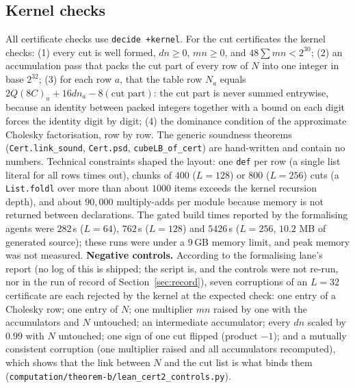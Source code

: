 \documentclass[11pt]{amsart}
\theoremstyle{remark}
\newcommand{\lean}[1]{\texttt{#1}}
\begin{document}
\subsection{Kernel checks}
All certificate checks use \texttt{decide +kernel}. For the cut certificates the kernel checks: (1) every cut is well formed, $dn\ge0$, $mn\ge0$, and $48\sum mn<2^{30}$; (2) an accumulation pass that packs the cut part of every row of $N$ into one integer in base $2^{32}$;
(3) for each row $a$, that the table row $N_a$ equals $2Q(8C)_a+16dn_a-8(\text{cut part})$: the cut part is never summed entrywise, because an identity between packed integers together with a bound on each digit
forces the identity digit by digit; (4) the dominance condition of the approximate Cholesky factorisation, row by row. The generic soundness theorems (\lean{Cert.link\_sound}, \lean{Cert.psd}, \lean{cubeLB\_of\_cert}) are hand-written and contain no numbers.
Technical constraints shaped the layout: one \texttt{def} per row (a single list literal for all rows times out), chunks of $400$ ($L=128$) or $800$ ($L=256$) cuts (a \texttt{List.foldl} over more than about $1000$ items exceeds the kernel recursion depth), and about $90{,}000$ multiply-adds per module
because memory is not returned between declarations. The gated build times reported by the formalising agents were $282$\,s ($L=64$), $762$\,s ($L=128$) and $5426$\,s ($L=256$, $10.2$ MB of generated source); these runs were under a $9$\,GB memory limit, and peak memory was not measured.
\textbf{Negative controls.} According to the formalising lane's report (no log of this is shipped; the script is, and the controls were not re-run, nor in the run of record of Section~\ref{sec:record}), seven corruptions of an $L=32$ certificate are each rejected by the kernel at the expected check: one entry of a Cholesky row; one entry of $N$; one multiplier $mn$ raised by one with the accumulators and $N$ untouched; an intermediate accumulator;
every $dn$ scaled by $0.99$ with $N$ untouched; one sign of one cut flipped (product $-1$); and a mutually consistent corruption (one multiplier raised and all accumulators recomputed), which shows that the link between $N$ and the cut list is what binds them (\texttt{computation/theorem-b/lean\_cert2\_controls.py}).
\end{document}
